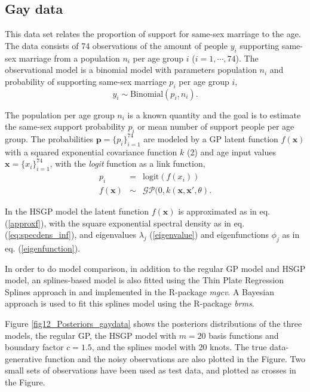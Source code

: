 \documentclass[]{interact}
\theoremstyle{plain}%
\theoremstyle{definition}
\theoremstyle{remark}
\begin{document}
\subsection{Gay data}
This data set relates the proportion of support for same-sex marriage to the age. The data consists of 74 observations of the amount of people $y_i$ supporting same-sex marriage from a population $n_i$ per age group $i$ ($i=1,\cdots,74$). The observational model is a binomial model with parameters population $n_i$ and probability of supporting same-sex marriage $p_i$ per age group $i$,
%
\begin{equation*}
y_i \sim \text{Binomial}(p_i, n_i).
\end{equation*}

\noindent The population per age group $n_i$ is a known quantity and the goal is to estimate the same-sex support probability $p_i$ or mean number of support people per age group. The probabilities $\mathbf{p}=\{p_i\}_{i=1}^{74}$ are modeled by a GP latent function $f(\mathbf{x})$ with a squared exponential covariance function $k$ (2) and age input values $\mathbf{x}=\{x_i\}_{i=1}^{74}$, with the {\it logit} function as a link function,
%
\begin{eqnarray*} \label{eq:gpprior_gay}
p_i &=& \text{logit}(f(x_i)) \nonumber \\
f(\mathbf{x}) &\sim& \mathcal{GP}(0, k(\mathbf{x},\mathbf{x}', \theta).
\end{eqnarray*}

In the HSGP model the latent function $f(\mathbf{x})$ is approximated as in eq. (\ref{approxf}), with the square exponential spectral density as in eq. (\ref{eq:specdens_inf}), and eigenvalues $\lambda_j$ (\ref{eigenvalue}) and eigenfunctions $\phi_j$ as in eq. (\ref{eigenfunction}). 

In order to do model comparison, in addition to the regular GP model and HSGP model, an splines-based model is also fitted using the Thin Plate Regression Splines approach in \cite{wood2003thin} and implemented in the R-package \textit{mgcv}. A Bayesian approach is used to fit this splines model using the R-package \textit{brms}.

Figure \ref{fig12_Posteriors_gaydata} shows the posteriors distributions of the three models, the regular GP, the HSGP model with $m=20$ basis functions and boundary factor $c=1.5$, and the splines model with 20 knots. The true data-generative function and the noisy observations are also plotted in the Figure. Two small sets of observations have been used as test data, and plotted as crosses in the Figure.
\end{document}
